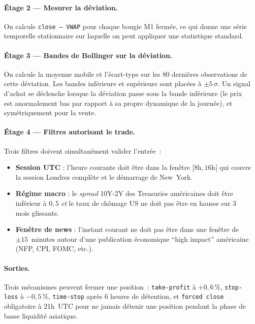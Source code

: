 \documentclass[11pt, a4paper]{scrartcl}
\begin{document}
\paragraph{Étage 2 --- Mesurer la déviation.}
On calcule \texttt{close~--~VWAP} pour chaque bougie M1 fermée, ce qui donne une série temporelle stationnaire sur laquelle on peut appliquer une statistique standard.

\paragraph{Étage 3 --- Bandes de Bollinger sur la déviation.}
On calcule la moyenne mobile et l'écart-type sur les 80 dernières observations de cette déviation. Les bandes inférieure et supérieure sont placées à $\pm 5\,\sigma$. Un signal d'achat se déclenche lorsque la déviation passe sous la bande inférieure (le prix est anormalement bas par rapport à sa propre dynamique de la journée), et symétriquement pour la vente.

\paragraph{Étage 4 --- Filtres autorisant le trade.}
Trois filtres doivent simultanément valider l'entrée~:
\begin{itemize}
\item \textbf{Session UTC} : l'heure courante doit être dans la fenêtre $[8\text{h}, 16\text{h}[$ qui couvre la session Londres complète et le démarrage de New~York.
\item \textbf{Régime macro} : le \emph{spread} 10Y-2Y des Treasuries américaines doit être inférieur à $0{,}5$ \emph{et} le taux de chômage US ne doit pas être en hausse sur 3 mois glissants.
\item \textbf{Fenêtre de news} : l'instant courant ne doit pas être dans une fenêtre de $\pm 15$~minutes autour d'une publication économique \enquote{high impact} américaine (NFP, CPI, FOMC, etc.).
\end{itemize}

\paragraph{Sorties.}
Trois mécanismes peuvent fermer une position~: \texttt{take-profit} à $+0{,}6\,\%$, \texttt{stop-loss} à $-0{,}5\,\%$, \texttt{time-stop} après 6 heures de détention, et \texttt{forced close} obligatoire à 21h~UTC pour ne jamais détenir une position pendant la phase de basse liquidité asiatique.
\end{document}
